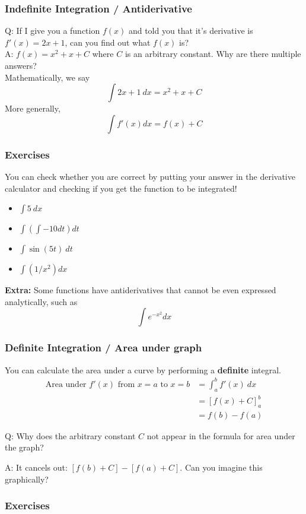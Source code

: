 \documentclass{article}
\begin{document}
\subsubsection{Indefinite Integration / Antiderivative}
Q: If I give you a function $f(x)$ and told you that it's derivative is $f'(x) = 2x + 1$, can you find out what $f(x)$ is? \\
A: $f(x) = x^2 + x + C$ where $C$ is an arbitrary constant. Why are there multiple answers?\\[10pt]
Mathematically, we say $$\int 2x + 1\ dx = x^2 + x + C$$
More generally, $$\int f'(x) dx = f(x) + C$$

\subsubsection{Exercises}
You can check whether you are correct by putting your answer in the derivative calculator and checking if you get the function to be integrated!
\begin{itemize}
    \item $\int 5\ dx$
    \item $\int \left( \int -10 dt \right) dt$
    \item $\int \sin(5t) \ dt$
    \item $\int (1/x^2) dx$
\end{itemize}


\textbf{Extra:} Some functions have antiderivatives that cannot be even expressed analytically, such as $$\int e^{-x^2} dx$$

\subsubsection{Definite Integration / Area under graph}
You can calculate the area under a curve by performing a \textbf{definite} integral.
\begin{align}
    \text{Area under }f'(x)\text{ from }x=a\text{ to }x=b &= \int_a^b f'(x)\ dx  \\
    &= \left[f(x) + C\right]^b_a \\
    &= f(b) - f(a)
\end{align}

Q: Why does the arbitrary constant $C$ not appear in the formula for area under the graph? 

A: It cancels out: $[f(b) + C] - [f(a) + C]$. Can you imagine this graphically? 

\subsubsection{Exercises}
\end{document}
